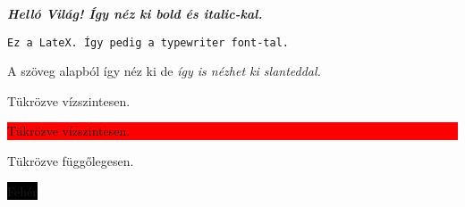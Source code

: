 \documentclass{article}
\begin{document}
\large \textbf{\textit{Helló Világ! Így néz ki bold és italic-kal.}}
\color{blue}

\texttt{Ez a LateX. Így pedig a typewriter font-tal.}

\color{black}
A szöveg alapból így néz ki de {\sl így is nézhet ki slanteddal.}\bigskip

Tükrözve vízszintesen.\par
{} \par\bigskip
\colorbox{red}{Tükrözve vízszintesen.\par
{}} \par\bigskip

Tükrözve függőlegesen.\par
\framebox{\raisebox{\depth}{\scalebox{-1}[-1]{Tükrözve függőlegesen.}}} \par\bigskip
\colorbox{black} {\color{white} Fehér}

\color{red}
\end{document}
